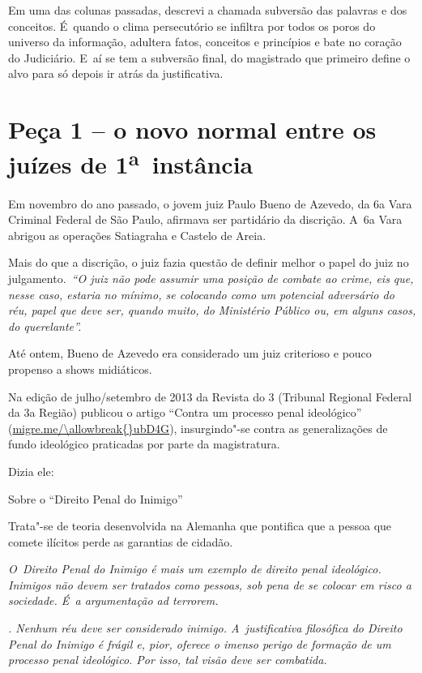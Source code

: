  

Em uma das colunas passadas, descrevi a chamada subversão das palavras e
dos conceitos. É~quando o clima persecutório se infiltra por todos os
poros do universo da informação, adultera fatos, conceitos e princípios
e bate no coração do Judiciário. E~aí se tem a subversão final, do
magistrado que primeiro define o alvo para só depois ir atrás da
justificativa.

\section{Peça 1 -- o novo normal entre os juízes de
1\textsuperscript{a}~instância}

Em novembro do ano passado, o jovem juiz Paulo Bueno de Azevedo, da 6a
Vara Criminal Federal de São Paulo, afirmava ser partidário da
discrição. A~6a Vara abrigou as operações Satiagraha e Castelo de Areia.

Mais do que a discrição, o juiz fazia questão de definir melhor o papel
do juiz no julgamento.~\emph{``O juiz não pode assumir uma posição de
combate ao crime, eis que, nesse caso, estaria no mínimo, se colocando
como um potencial adversário do réu, papel que deve ser, quando muito,
do Ministério Público ou, em alguns casos, do querelante''.}

Até ontem, Bueno de Azevedo era considerado um juiz criterioso e pouco
propenso a shows midiáticos.

Na edição de julho/\allowbreak{}setembro de 2013 da Revista do 3 (Tribunal
Regional Federal da 3a Região) publicou o artigo ``Contra um processo
penal ideológico'' (\url{migre.me/\allowbreak{}ubD4G}), insurgindo"-se contra
as generalizações de fundo ideológico praticadas por parte da
magistratura.

Dizia ele:

Sobre o ``Direito Penal do Inimigo''

Trata"-se de teoria desenvolvida na Alemanha que pontifica que a pessoa
que comete ilícitos perde as garantias de cidadão.

\emph{O~Direito Penal do Inimigo é mais um exemplo de direito penal
ideológico. Inimigos não devem ser tratados como pessoas, sob pena de se
colocar em risco a sociedade. É~a argumentação ad terrorem.}

\emph{\redondo{[…]}. Nenhum réu deve ser considerado inimigo. A~justificativa filosófica do Direito Penal do Inimigo é frágil e, pior,
oferece o imenso perigo de formação de um processo penal ideológico. Por
isso, tal visão deve ser combatida.}

